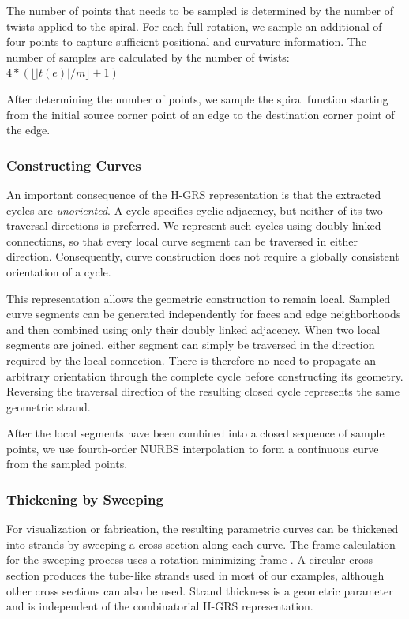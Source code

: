 \documentclass[acmtog]{acmart}
\begin{document}
The number of points that needs to be sampled is determined by the number of
twists applied to the spiral. For each full rotation, we sample an additional of four points
to capture sufficient positional and curvature information. The number of
samples are calculated by the number of twists:
$4*(\lfloor |t(e)|/m\rfloor+1)$

After determining the number of points, we sample the spiral function starting
from the initial source corner point of an edge to the destination corner
point of the edge.

\subsubsection{Constructing Curves}

An important consequence of the H-GRS representation is that the extracted
cycles are \emph{unoriented}. A cycle specifies cyclic adjacency, but neither
of its two traversal directions is preferred. We represent such cycles using
doubly linked connections, so that every local curve segment can be traversed
in either direction. Consequently, curve construction does not require a
globally consistent orientation of a cycle.

This representation allows the geometric construction to remain local.
Sampled curve segments can be generated independently for faces and edge
neighborhoods and then combined using only their doubly linked adjacency.
When two local segments are joined, either segment can simply be traversed in
the direction required by the local connection. There is therefore no need
to propagate an arbitrary orientation through the complete cycle before
constructing its geometry. Reversing the traversal direction of the resulting
closed cycle represents the same geometric strand.

After the local segments have been combined into a closed sequence of sample
points, we use fourth-order NURBS interpolation to form a continuous curve
from the sampled points.

\subsubsection{Thickening by Sweeping}

For visualization or fabrication, the resulting parametric curves can be
thickened into strands by sweeping a cross section along each curve. The frame
calculation for the sweeping process uses a rotation-minimizing frame
\cite{rmf}. A circular cross section produces the tube-like strands used in
most of our examples, although other cross sections can also be used. Strand
thickness is a geometric parameter and is independent of the combinatorial
H-GRS representation.
\end{document}
